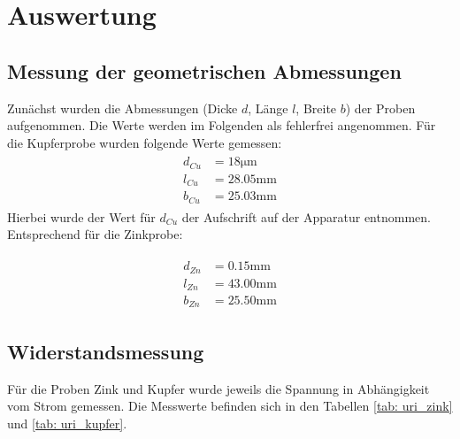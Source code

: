 \section{Auswertung}

\subsection{Messung der geometrischen Abmessungen}
Zunächst wurden die Abmessungen (Dicke $d$, Länge $l$, Breite $b$) der Proben aufgenommen. Die Werte
werden im Folgenden als fehlerfrei angenommen. Für die Kupferprobe wurden folgende Werte gemessen:
\begin{align}
  \begin{aligned}
    d_{Cu} &= 18 \si{\micro \meter} \\ %
    l_{Cu} &= 28.05 \si{\milli \meter}\\ %
    b_{Cu} &= 25.03 \si{\milli \meter} %
        \label{eq: abmessungen_kupfer}
      \end{aligned}
\end{align}
Hierbei wurde der Wert für $d_{Cu}$ der Aufschrift auf der Apparatur entnommen.
Entsprechend für die Zinkprobe:

\begin{align}
  \begin{aligned}
    d_{Zn} &= 0.15 \si{\milli \meter} \\ %
    l_{Zn} &= 43.00 \si{\milli \meter}\\
    b_{Zn} &= 25.50 \si{\milli \meter}
        \label{eq: abmessungen_zink}
      \end{aligned}
\end{align}



\subsection{Widerstandsmessung}
Für die Proben Zink und Kupfer wurde jeweils die Spannung in Abhängigkeit vom Strom gemessen. Die Messwerte befinden sich
in den Tabellen \ref{tab: uri_zink} und \ref{tab: uri_kupfer}.

\begin{minipage}{\textwidth}

\hfill

\end{minipage}

